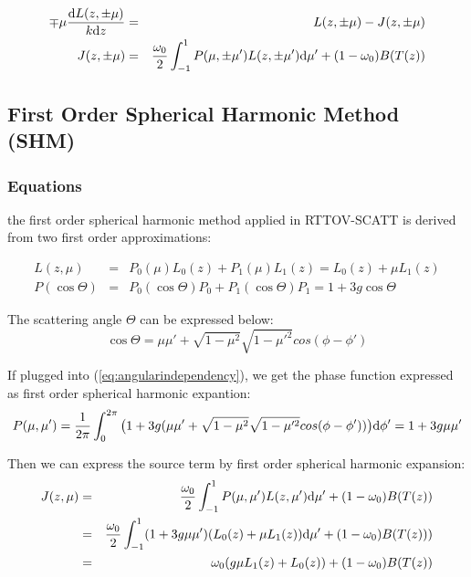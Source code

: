 \documentclass[a4paper]{report}
\begin{document}
\begin{eqnarray} \label{eq:firstprincipal2}
\mp\mu \frac{\mathrm{d} L(z, \pm\mu)}{k \mathrm{d} z} & = & 
L(z, \pm\mu) - J(z, \pm\mu) \nonumber\\
J(z, \pm\mu) & = &
\frac{\omega_{0}}{2}\int_{-1}^{1}
P(\mu, \pm\mu')L(z,\pm\mu')\mathrm{d}\mu'
+ (1-\omega_{0})B(T(z))
\end{eqnarray}

\subsection{First Order Spherical Harmonic Method (SHM)}
\subsubsection{Equations}
the first order spherical harmonic method applied in RTTOV-SCATT
is derived from two first order approximations:

\begin{eqnarray} \label{eq:SHMapprox}
L(z,\mu) & = & P_{0}(\mu)L_{0}(z) + P_{1}(\mu)L_{1}(z) 
 =  L_{0}(z) + \mu L_{1}(z) \nonumber\\
P(\cos\Theta) & = & P_{0}(\cos\Theta)P_{0} + P_{1}(\cos\Theta)P_{1}
 =  1 + 3g\cos\Theta
\end{eqnarray}

The scattering angle $\Theta$ can be expressed below:
\begin{displaymath}
    \cos\Theta = \mu\mu' + \sqrt{1-\mu^{2}}\sqrt{1-\mu'^{2}}cos(\phi - \phi')
\end{displaymath}

If plugged into (\ref{eq:angularindependency}), we get the phase function expressed
as first order spherical harmonic expantion:
\begin{equation} \label{eq:pmumup}
    P(\mu,\mu') = \frac{1}{2\pi}\int_{0}^{2\pi}
    \big(
        1 + 3g(\mu\mu' + \sqrt{1-\mu^{2}}\sqrt{1-\mu'^{2}}cos(\phi - \phi'))
    \big)
        \mathrm{d}\phi'
    = 1 + 3g\mu\mu'
\end{equation}

Then we can express the source term by first order spherical harmonic expansion:
\begin{eqnarray}
J(z,\mu) & = & \frac{\omega_{0}}{2}
\int_{-1}^{1}P(\mu, \mu')L(z, \mu')\mathrm{d}\mu'
+ (1-\omega_{0})B(T(z))  \nonumber\\
{} & = &  \frac{\omega_{0}}{2}
\int_{-1}^{1}(1+3g\mu\mu')(L_{0}(z) + \mu L_{1}(z))\mathrm{d}\mu'
+ (1-\omega_{0})B(T(z)))  \nonumber\\
{} & = &  \omega_{0}(g \mu L_{1}(z) + L_{0}(z))
+ (1-\omega_{0})B(T(z))
\end{eqnarray}
\end{document}
